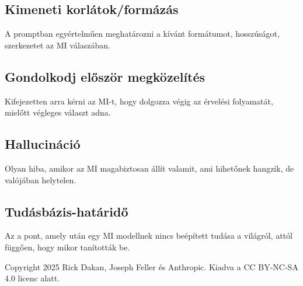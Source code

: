 \documentclass[a4paper, 11pt]{article}
\begin{document}
\begin{multicols}{2}
\subsection{Kimeneti korlátok/formázás}
A promptban egyértelműen meghatározni a kívánt formátumot, hosszúságot, szerkezetet az MI válaszában.

\subsection{Gondolkodj először megközelítés}
Kifejezetten arra kérni az MI-t, hogy dolgozza végig az érvelési folyamatát, mielőtt végleges választ adna.

\subsection{Hallucináció}
Olyan hiba, amikor az MI magabiztosan állít valamit, ami hihetőnek hangzik, de valójában helytelen.

\subsection{Tudásbázis-határidő}
Az a pont, amely után egy MI modellnek nincs beépített tudása a világról, attól függően, hogy mikor tanították be.

\end{multicols}

\vfill
\begin{center}
\small
Copyright 2025 Rick Dakan, Joseph Feller és Anthropic. Kiadva a CC BY-NC-SA 4.0 licenc alatt.
\end{center}
\end{document}

